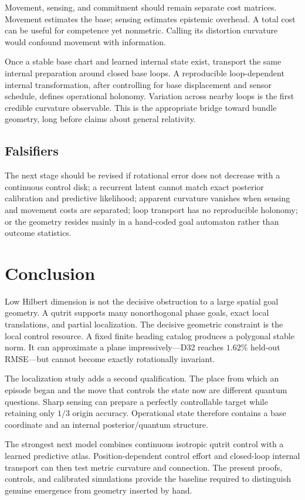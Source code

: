\documentclass[11pt]{article}
\theoremstyle{definition}\newtheorem{definition}[theorem]{Definition}
\theoremstyle{remark}\newtheorem{remark}[theorem]{Remark}
\begin{document}
Movement, sensing, and commitment should remain separate cost matrices.
Movement estimates the base; sensing estimates epistemic overhead. A total
cost can be useful for competence yet nonmetric. Calling its distortion
curvature would confound movement with information.

Once a stable base chart and learned internal state exist, transport the same
internal preparation around closed base loops. A reproducible loop-dependent
internal transformation, after controlling for base displacement and sensor
schedule, defines operational holonomy. Variation across nearby loops is the
first credible curvature observable. This is the appropriate bridge toward
bundle geometry, long before claims about general relativity.

\subsection{Falsifiers}

The next stage should be revised if rotational error does not decrease with a
continuous control disk; a recurrent latent cannot match exact posterior
calibration and predictive likelihood; apparent curvature vanishes when
sensing and movement costs are separated; loop transport has no reproducible
holonomy; or the geometry resides mainly in a hand-coded goal automaton rather
than outcome statistics.

\section{Conclusion}

Low Hilbert dimension is not the decisive obstruction to a large spatial goal
geometry. A qutrit supports many nonorthogonal phase goals, exact local
translations, and partial localization. The decisive geometric constraint is
the local control resource. A fixed finite heading catalog produces a
polygonal stable norm. It can approximate a plane impressively---D32 reaches
\(1.62\%\) held-out RMSE---but cannot become exactly rotationally invariant.

The localization study adds a second qualification. The place from which an
episode began and the move that controls the state now are different quantum
questions. Sharp sensing can prepare a perfectly controllable target while
retaining only \(1/3\) origin accuracy. Operational state therefore contains
a base coordinate and an internal posterior/quantum structure.

The strongest next model combines continuous isotropic qutrit control with a
learned predictive atlas. Position-dependent control effort and closed-loop
internal transport can then test metric curvature and connection. The present
proofs, controls, and calibrated simulations provide the baseline required to
distinguish genuine emergence from geometry inserted by hand.
\end{document}
